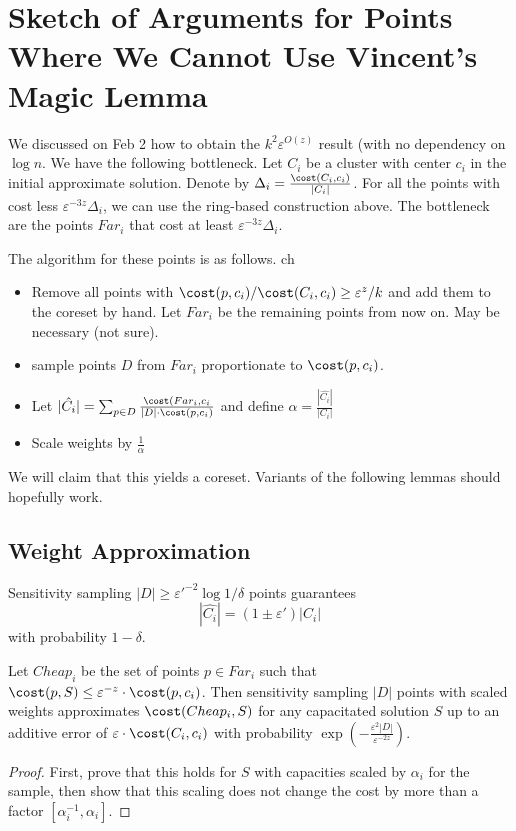 
\section{Sketch of Arguments for Points Where We Cannot Use Vincent's Magic Lemma}

We discussed on Feb 2 how to obtain the $k^2 \varepsilon^{O(z)}$ result (with no dependency on $\log n$. 
We have the following bottleneck. Let $C_i$ be a cluster with center $c_i$ in the initial approximate solution. Denote by $\Delta_i = \frac{\cost(C_i,c_i)}{|C_i|}$. For all the points with cost less $\varepsilon^{-3z}\Delta_i$, we can use the ring-based construction above. The bottleneck are the points $Far_i$ that cost at least $\varepsilon^{-3z}\Delta_i$.

The algorithm for these points is as follows.
ch
\begin{itemize}
\item Remove all points with $\cost(p,c_i)/\cost(C_i,c_i) \geq \varepsilon^z/k$ and add them to the coreset by hand. Let $Far_i$ be the remaining points from now on. May be necessary (not sure).
    \item sample points $D$ from $Far_i$ proportionate to $\cost(p,c_i)$.
    \item Let $|\hat{C_i}| = \sum_{p\in D} \frac{\cost(Far_i,c_i}{|D| \cdot \cost(p,c_i)}$ and define $\alpha = \frac{|\hat{C_i}|}{|C_i|}$
    \item Scale weights by $\frac{1}{\alpha}$
\end{itemize}



We will claim that this yields a coreset. Variants of the following lemmas should hopefully work.


\subsection{Weight Approximation}

\begin{lemma}
Sensitivity sampling $|D|\geq \varepsilon'^{-2}\log 1/\delta$ points guarantees 
$$|\hat{C_i}| = (1\pm \varepsilon')|C_i|$$
with probability $1-\delta$.
\end{lemma}

\begin{lemma}
\label{lem:Close_i}
Let $Cheap_i$ be the set of points $p\in Far_i$ such that $\cost(p,S) \leq \varepsilon^{-z}\cdot \cost(p,c_i)$. Then sensitivity sampling $|D|$ points with scaled weights approximates $\cost(Cheap_i,S)$ for any capacitated solution $S$ up to an additive error of $\varepsilon\cdot\cost(C_i,c_i)$ with probability 
$\exp\left(-\frac{\varepsilon^2 |D|}{\varepsilon^{-2z}}\right)$.
\end{lemma}
\begin{proof}
First, prove that this holds for $S$ with capacities scaled by $\alpha_i$ for the sample, then show that this scaling does not change the cost by more than a factor $[\alpha_i^{-1},\alpha_i]$.
\end{proof}

